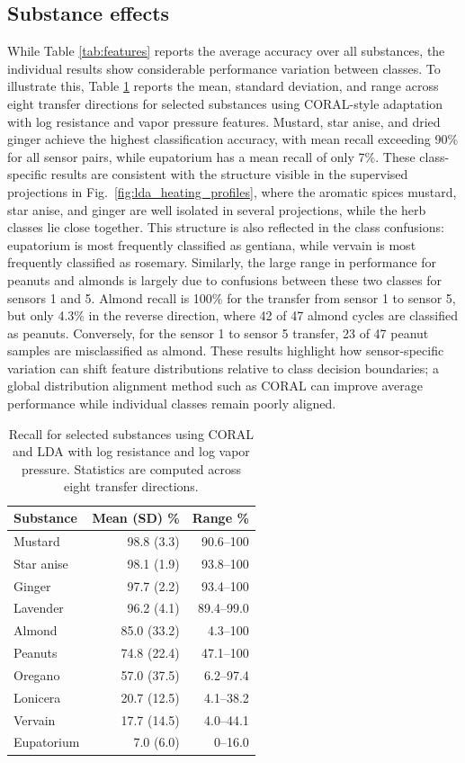 \documentclass[conference]{IEEEtran}
\begin{document}
\subsection{Substance effects}\label{sec:substance}
While Table \ref{tab:features} reports the average accuracy over all substances, the individual results show considerable performance variation between classes. To illustrate this, Table \ref{tab:selected-class-recall} reports the mean, standard deviation, and range across eight transfer directions for selected substances using CORAL-style adaptation with log resistance and vapor pressure features. Mustard, star anise, and dried ginger achieve the highest classification accuracy, with mean recall exceeding 90\% for all sensor pairs, while eupatorium has a mean recall of only 7\%. These class-specific results are consistent with the structure visible in the supervised projections in Fig.~\ref{fig:lda_heating_profiles}, where the aromatic spices mustard, star anise, and ginger are well isolated in several projections, while the herb classes lie close together. This structure is also reflected in the class confusions: eupatorium is most frequently classified as gentiana, while vervain is most frequently classified as rosemary. Similarly, the large range in performance for peanuts and almonds is largely due to confusions between these two classes for sensors 1 and 5. Almond recall is 100\% for the transfer from sensor 1 to sensor 5, but only 4.3\% in the reverse direction, where 42 of 47 almond cycles are classified as peanuts. Conversely, for the sensor 1 to sensor 5 transfer, 23 of 47 peanut samples are misclassified as almond.
These results highlight how sensor-specific variation can shift feature distributions relative to class decision boundaries; a global distribution alignment method such as CORAL can improve average performance while individual classes remain poorly aligned.

\begin{table}[htbp]
\centering
\caption{Recall for selected substances using CORAL and LDA
with log resistance and log vapor pressure. Statistics are
computed across eight transfer directions.}
\label{tab:selected-class-recall}
\footnotesize
\begin{tabular}{|l|r|r|}
\hline
\textbf{Substance} & \textbf{Mean (SD) \%} & \textbf{Range \%} \\
\hline
Mustard    & 98.8 (3.3)  & 90.6--100 \\
Star anise & 98.1 (1.9)  & 93.8--100 \\
Ginger     & 97.7 (2.2)  & 93.4--100 \\
Lavender   & 96.2 (4.1)  & 89.4--99.0 \\
Almond     & 85.0 (33.2) & 4.3--100 \\
Peanuts    & 74.8 (22.4) & 47.1--100 \\
Oregano    & 57.0 (37.5) & 6.2--97.4 \\
Lonicera   & 20.7 (12.5) & 4.1--38.2 \\
Vervain    & 17.7 (14.5) & 4.0--44.1 \\
Eupatorium & 7.0 (6.0)   & 0--16.0 \\
\hline
\end{tabular}
\end{table}
\end{document}
